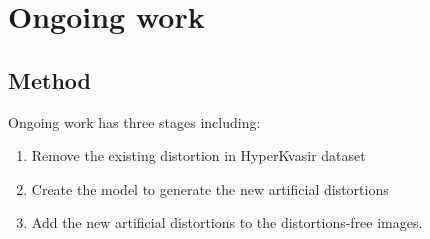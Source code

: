 \documentclass{libs/ufc_format}
\begin{document}
\section{Ongoing work}
\subsection{Method}
\begin{frame}{Ongoing work}
     has three stages including:
    \begin{enumerate}
        \item Remove the existing distortion in HyperKvasir dataset
        \item Create the model to generate the new artificial distortions
        \item Add the new artificial distortions to the distortions-free images.
    \end{enumerate}









\end{frame}
\end{document}
